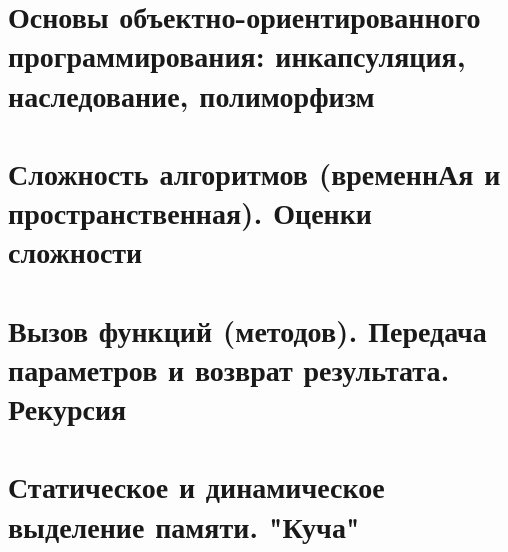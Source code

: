 \section{Основы объектно-ориентированного программирования: инкапсуляция, наследование, полиморфизм}
\section{Сложность алгоритмов (временнАя и пространственная). Оценки сложности}
\section{Вызов функций (методов). Передача параметров и возврат результата. Рекурсия}
\section{Статическое и динамическое выделение памяти. "Куча"}
